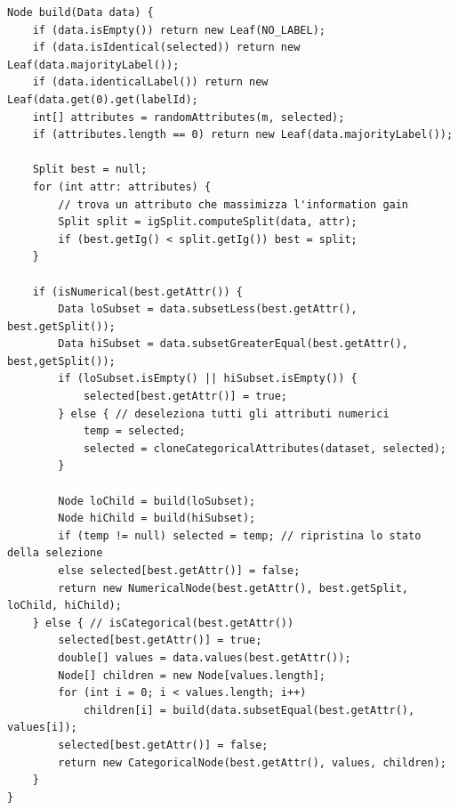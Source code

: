\documentclass[a4paper,11pt,twoside,openright,fleqn]{book}
\begin{document}
\begin{lstlisting}[float=hptb,caption=Codice semplificato dell'algoritmo di costruzione dell'albero,label=code:defaulttreebuilder]
Node build(Data data) {
    if (data.isEmpty()) return new Leaf(NO_LABEL);
    if (data.isIdentical(selected)) return new Leaf(data.majorityLabel());
    if (data.identicalLabel()) return new Leaf(data.get(0).get(labelId);
    int[] attributes = randomAttributes(m, selected);
    if (attributes.length == 0) return new Leaf(data.majorityLabel());
    
    Split best = null;
    for (int attr: attributes) {
        // trova un attributo che massimizza l'information gain
        Split split = igSplit.computeSplit(data, attr);
        if (best.getIg() < split.getIg()) best = split;
    }
    
    if (isNumerical(best.getAttr()) {
        Data loSubset = data.subsetLess(best.getAttr(), best.getSplit());
        Data hiSubset = data.subsetGreaterEqual(best.getAttr(), best,getSplit());
        if (loSubset.isEmpty() || hiSubset.isEmpty()) {
            selected[best.getAttr()] = true;
        } else { // deseleziona tutti gli attributi numerici
            temp = selected;
            selected = cloneCategoricalAttributes(dataset, selected);
        }
        
        Node loChild = build(loSubset);
        Node hiChild = build(hiSubset);
        if (temp != null) selected = temp; // ripristina lo stato della selezione
        else selected[best.getAttr()] = false;
        return new NumericalNode(best.getAttr(), best.getSplit, loChild, hiChild);
    } else { // isCategorical(best.getAttr())
        selected[best.getAttr()] = true;
        double[] values = data.values(best.getAttr());
        Node[] children = new Node[values.length];
        for (int i = 0; i < values.length; i++)
            children[i] = build(data.subsetEqual(best.getAttr(), values[i]);
        selected[best.getAttr()] = false;
        return new CategoricalNode(best.getAttr(), values, children);
    }
}
\end{lstlisting}
\end{document}

